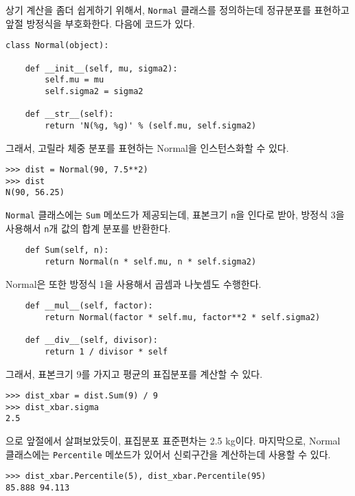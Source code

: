 상기 계산을 좀더 쉽게하기 위해서, {\tt Normal} 클래스를 정의하는데 정규분포를 표현하고 앞절 방정식을 부호화한다. 다음에 코드가 있다.

\begin{verbatim}
class Normal(object):

    def __init__(self, mu, sigma2):
        self.mu = mu
        self.sigma2 = sigma2

    def __str__(self):
        return 'N(%g, %g)' % (self.mu, self.sigma2)
\end{verbatim}

그래서, 고릴라 체중 분포를 표현하는 Normal을 인스턴스화할 수 있다.

\begin{verbatim}
>>> dist = Normal(90, 7.5**2)
>>> dist
N(90, 56.25)
\end{verbatim}

{\tt Normal} 클래스에는 {\tt Sum} 메쏘드가 제공되는데, 표본크기 {\tt n}을 인다로 받아, 방정식 3을 사용해서 {\tt n}개 값의 합계 분포를 반환한다.

\begin{verbatim}
    def Sum(self, n):
        return Normal(n * self.mu, n * self.sigma2)
\end{verbatim}

Normal은 또한 방정식 1을 사용해서 곱셈과 나눗셈도 수행한다.

\begin{verbatim}
    def __mul__(self, factor):
        return Normal(factor * self.mu, factor**2 * self.sigma2)

    def __div__(self, divisor):
        return 1 / divisor * self
\end{verbatim}

그래서, 표본크기 9를 가지고 평균의 표집분포를 계산할 수 있다.

\begin{verbatim}
>>> dist_xbar = dist.Sum(9) / 9
>>> dist_xbar.sigma
2.5
\end{verbatim}

으로 앞절에서 살펴보았듯이, 표집분포 표준편차는 2.5 kg이다.
마지막으로, Normal 클래스에는 {\tt Percentile} 메쏘드가 있어서 신뢰구간을 계산하는데 사용할 수 있다.

\begin{verbatim}
>>> dist_xbar.Percentile(5), dist_xbar.Percentile(95)
85.888 94.113
\end{verbatim}

